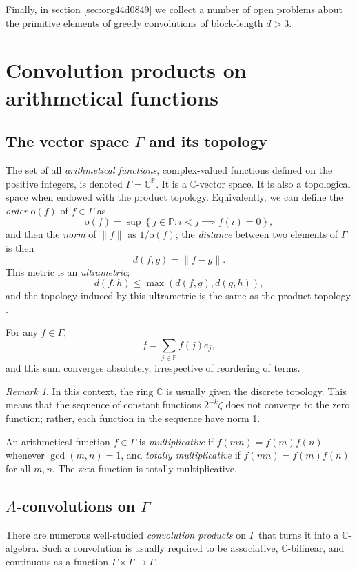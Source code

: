 \documentclass[12pt]{article}
\theoremstyle{definition}
\theoremstyle{remark}
\newtheorem{remark}{Remark}
\theoremstyle{plain}
\newcommand\setsuchas[2]{\left\{{#1}:{#2}\right\}}
\newcommand{\NNp}{{\mathbb{P}}}
\newcommand{\CC}{{\mathbb{C}}}
\newcommand{\order}{{\mathrm{o}}}
\newcommand{\norm}[1]{\lVert #1 \rVert}
\begin{document}
Finally, in section \ref{sec:org44d0849} we collect a number of
open problems about the primitive elements of greedy convolutions of block-length \(d > 3\).
\section{Convolution products on arithmetical functions}
\label{sec:org5b591e8}
\subsection{The vector space \(\Gamma\) and its topology}
\label{sec:org0cede2a}
The set of all \emph{arithmetical functions}, complex-valued functions defined on the positive integers, is
denoted \(\Gamma = \CC^{\NNp}\). It is a \(\CC\)-vector space.
It is also a topological space when endowed with the
product topology. Equivalently, we can define the \emph{order} \(\order(f)\) of \(f \in \Gamma\) as
\begin{equation}
\label{eq:orgbf47533}
\order(f) = \sup \setsuchas{j \in \NNp}{i < j \implies f(i) = 0},
\end{equation}
and then the \emph{norm} of \(\norm{f}\) as \(1/\order(f)\); the \emph{distance} between two elements of \(\Gamma\)
is then
\[d(f,g) =\norm{f-g}.\]
This metric is an \emph{ultrametric};
\[d(f,h) \le \max \left( d(f,g), d(g,h) \right),\]
and the topology induced by this ultrametric is the same as the product topology \cite{vring,dvar}. 

For any \(f \in \Gamma\),
\begin{equation}
\label{eq:org5a39e0b}
f = \sum_{j \in \NNp} f(j)e_{j},
\end{equation}
and this sum converges absolutely, irrespective of reordering of terms.

\begin{remark}
In this context, the ring \(\CC\) is
usually given the discrete topology.
This means that  the sequence of constant functions \(2^{-k} \zeta\) does not
converge to the zero function; rather, each function in the sequence have norm 1.
\end{remark}

An arithmetical function \(f \in \Gamma\) is \emph{multiplicative} if \(f(mn)=f(m)f(n)\) whenever \(\gcd(m,n)=1\),
and \emph{totally multiplicative} if \(f(mn)=f(m)f(n)\) for all \(m,n\).
The zeta function is totally multiplicative.
\subsection{\(A\)-convolutions on \(\Gamma\)}
\label{sec:orgc10c7e3}
There are numerous well-studied \emph{convolution products} on \(\Gamma\) that turns it into a \(\CC\)-algebra.
Such a convolution is usually required to be associative, \(\CC\)-bilinear, and continuous as a
function \(\Gamma \times \Gamma \to \Gamma\). 
\end{document}
